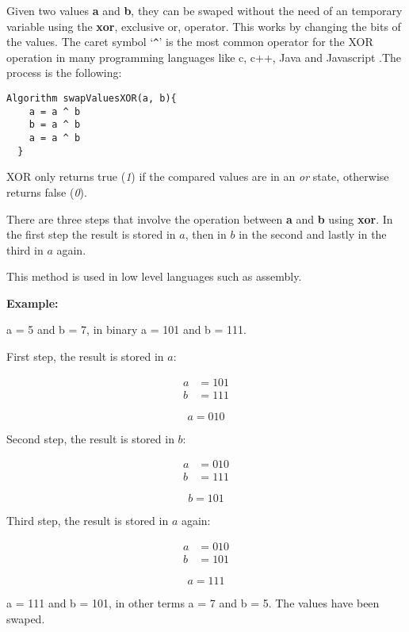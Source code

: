 Given two values \textbf{a} and \textbf{b}, they can be swaped without the need of an temporary variable using the \textbf{xor}, exclusive or, operator. This works by changing the bits of the values. The caret symbol `\verb|^|' is the most common operator for the XOR operation in many programming languages like c, c++, Java and Javascript .The process is the following:

\begin{lstlisting}[style=general,caption=XOR swap]
  Algorithm swapValuesXOR(a, b){
    a = a ^ b
    b = a ^ b
    a = a ^ b
  }
\end{lstlisting}

XOR only returns true (\emph{1}) if the compared values are in an \emph{or} state, otherwise returns false (\emph{0}).

There are three steps that involve the operation between \textbf{a} and \textbf{b} using \textbf{xor}. In the first step the result is stored in $a$, then in $b$ in the second and lastly in the third in $a$ again.

This method is used in low level languages such as assembly.

\textbf{Example:}

a = 5 and b = 7, in binary a = 101 and b = 111.

First step, the result is stored in $a$:

\begin{align*}
  a &= 101 \\
  b &= 111
\end{align*}

\[\boxed{
  a = 010
}\]

Second step, the result is stored in $b$:

\begin{align*}
  a &= 010 \\
  b &= 111
\end{align*}

\[\boxed{
  b = 101
}\]

Third step, the result is stored in $a$ again:

\begin{align*}
  a &= 010 \\
  b &= 101
\end{align*}

\[\boxed{
  a = 111
}\]

a = 111 and b = 101, in other terms a = 7 and b = 5. The values have been swaped.
